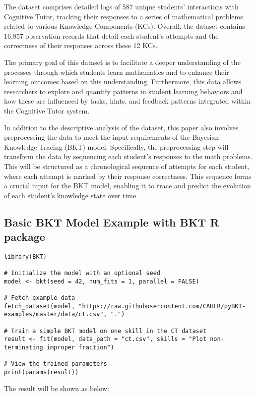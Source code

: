 \documentclass{article}
\begin{document}
The dataset comprises detailed logs of 587 unique students' interactions with Cognitive Tutor, tracking their responses to a series of mathematical problems related to various Knowledge Components (KCs). Overall, the dataset contains 16,857 observation records that detail each student's attempts and the correctness of their responses across these 12 KCs.

The primary goal of this dataset is to facilitate a deeper understanding of the processes through which students learn mathematics and to enhance their learning outcomes based on this understanding. Furthermore, this data allows researchers to explore and quantify patterns in student learning behaviors and how these are influenced by tasks, hints, and feedback patterns integrated within the Cognitive Tutor system.

In addition to the descriptive analysis of the dataset, this paper also involves preprocessing the data to meet the input requirements of the Bayesian Knowledge Tracing (BKT) model. Specifically, the preprocessing step will transform the data by sequencing each student's responses to the math problems. This will be structured as a chronological sequence of attempts for each student, where each attempt is marked by their response correctness. This sequence forms a crucial input for the BKT model, enabling it to trace and predict the evolution of each student's knowledge state over time.

\subsection{Basic BKT Model Example with BKT R package}

\begin{lstlisting}[caption={R code to train a simple BKT model}]
library(BKT)

# Initialize the model with an optional seed
model <- bkt(seed = 42, num_fits = 1, parallel = FALSE)

# Fetch example data
fetch_dataset(model, "https://raw.githubusercontent.com/CAHLR/pyBKT-examples/master/data/ct.csv", ".")

# Train a simple BKT model on one skill in the CT dataset
result <- fit(model, data_path = "ct.csv", skills = "Plot non-terminating improper fraction")

# View the trained parameters
print(params(result))
\end{lstlisting}

The result will be shown as below: 
\end{document}
